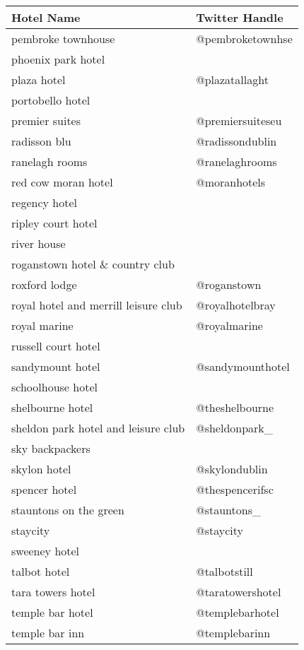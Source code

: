 \begin{table}[h!]
\begin{tabular}{|p{7cm}|p{5cm}|}
\hline
\rowcolor[HTML]{EFEFEF}
\textbf{Hotel Name} & \textbf{Twitter Handle} \\ \hline
pembroke townhouse & @pembroketownhse \\ \hline
phoenix park hotel &  \\ \hline
plaza hotel & @plazatallaght \\ \hline
portobello hotel &  \\ \hline
premier suites & @premiersuiteseu \\ \hline
radisson blu & @radissondublin \\ \hline
ranelagh rooms & @ranelaghrooms \\ \hline
red cow moran hotel & @moranhotels \\ \hline
regency hotel &  \\ \hline
ripley court hotel &  \\ \hline
river house &  \\ \hline
roganstown hotel \& country club &  \\ \hline
roxford lodge & @roganstown \\ \hline
royal hotel and merrill leisure club & @royalhotelbray \\ \hline
royal marine & @royalmarine \\ \hline
russell court hotel &  \\ \hline
sandymount hotel & @sandymounthotel \\ \hline
schoolhouse hotel &  \\ \hline
shelbourne hotel & @theshelbourne \\ \hline
sheldon park hotel and leisure club & @sheldonpark\_ \\ \hline
sky backpackers &  \\ \hline
skylon hotel & @skylondublin \\ \hline
spencer hotel & @thespencerifsc \\ \hline
stauntons on the green & @stauntons\_ \\ \hline
staycity & @staycity \\ \hline
sweeney hotel &  \\ \hline
talbot hotel & @talbotstill \\ \hline
tara towers hotel & @taratowershotel \\ \hline
temple bar hotel & @templebarhotel \\ \hline
temple bar inn & @templebarinn \\ \hline

\end{tabular}
\end{table}
